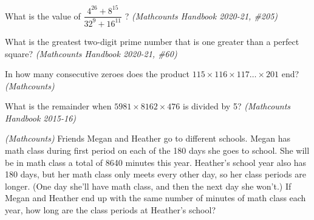 \documentclass[9pt]{beamer}
\begin{document}
    \begin{frame}[t]{7.4}
    \begin{block}{}
        What is the value of $ \dfrac{4^{26}+8^{15}}{32^{9} + 16^{11}} $ ? \textit{(Mathcounts Handbook 2020-21, \#205)}
         
    \end{block}
    \end{frame}
    
    \begin{frame}[t]{7.5}
    \begin{block}{}
        What is the greatest two-digit prime number that is one greater than a perfect square? \textit{(Mathcounts Handbook 2020-21, \#60)}
         
    \end{block}
    \end{frame}
    
    \begin{frame}[t]{7.6}
    \begin{block}{}
        In how many consecutive zeroes does the product $115 \times 116 \times 117 \ldots \times 201$ end? \textit{(Mathcounts)}
         
    \end{block}
    \end{frame}
    
     
    
     
    
    \begin{frame}[t]{7.7}
    \begin{block}{}
        What is the remainder when $5981 \times 8162 \times 476$ is divided by 5? \textit{(Mathcounts Handbook 2015-16)}
         
    \end{block}
    \end{frame}
    
    \begin{frame}[t]{7.8}
    \begin{block}{}
        \textit{(Mathcounts)} Friends Megan and Heather go to different schools.  Megan has math class during first period on each of the 180 days she goes to school.  She will be in math class a total of 8640 minutes this year.  Heather’s school year also has 180 days, but her math class only meets every other day, so her class periods are longer.  (One day she’ll have math class, and then the next day she won’t.)  If Megan and Heather end up with the same number of minutes of math class each year, how long are the class periods at Heather’s school?
        
    \end{block}
    \end{frame}
    
\end{document}
